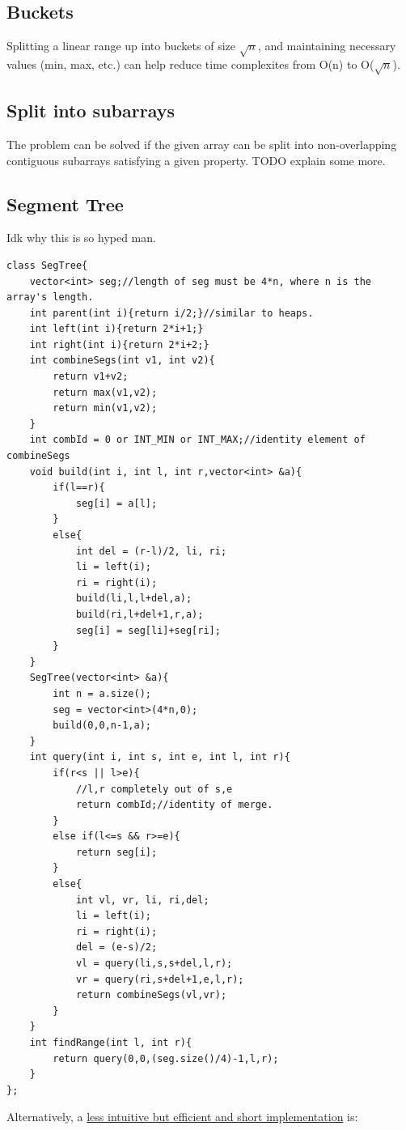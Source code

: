 \documentclass{report}
\begin{document}
\subsection{Buckets}
Splitting a linear range up into buckets of size $\sqrt{n}$, and maintaining
necessary values (min, max, etc.) can help reduce time complexites from O(n)
to O($\sqrt{n}$).
\subsection{Split into subarrays}
The problem can be solved if the given array can be split into non-overlapping contiguous subarrays satisfying a given property.
TODO explain some more.
\subsection{Segment Tree}
Idk why this is so hyped man.
\begin{lstlisting}
class SegTree{
    vector<int> seg;//length of seg must be 4*n, where n is the array's length.
    int parent(int i){return i/2;}//similar to heaps.
    int left(int i){return 2*i+1;}
    int right(int i){return 2*i+2;}
    int combineSegs(int v1, int v2){
        return v1+v2;
        return max(v1,v2);
        return min(v1,v2);
    }
    int combId = 0 or INT_MIN or INT_MAX;//identity element of combineSegs
    void build(int i, int l, int r,vector<int> &a){
        if(l==r){
            seg[i] = a[l];
        }
        else{
            int del = (r-l)/2, li, ri;
            li = left(i);
            ri = right(i);
            build(li,l,l+del,a);
            build(ri,l+del+1,r,a);
            seg[i] = seg[li]+seg[ri];
        }
    }
    SegTree(vector<int> &a){
        int n = a.size();
        seg = vector<int>(4*n,0);
        build(0,0,n-1,a);
    }
    int query(int i, int s, int e, int l, int r){
        if(r<s || l>e){
            //l,r completely out of s,e
            return combId;//identity of merge.
        }
        else if(l<=s && r>=e){
            return seg[i];
        }
        else{
            int vl, vr, li, ri,del;
            li = left(i);
            ri = right(i);
            del = (e-s)/2;
            vl = query(li,s,s+del,l,r);
            vr = query(ri,s+del+1,e,l,r);
            return combineSegs(vl,vr);
        }
    }
    int findRange(int l, int r){
        return query(0,0,(seg.size()/4)-1,l,r);
    }
};
\end{lstlisting}
Alternatively, a \href{https://codeforces.com/blog/entry/18051}{less intuitive but efficient and short implementation} is:
\end{document}
